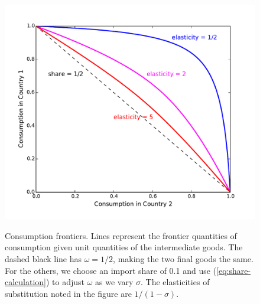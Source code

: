 \clearpage
\begin{figure}[htb]
\caption{Consumption frontiers.
Lines represent the frontier quantities of consumption given unit quantities of the intermediate goods.
The dashed black line has $\omega = 1/2$, making the two final goods the same.
For the others, we choose an import share of 0.1
and use (\ref{eq:share-calculation}) to adjust $\omega$ as we vary $\sigma$.
The elasticities of substitution noted in the figure are $1/(1-\sigma)$.}

\includegraphics[width=\textwidth]{images/BCFL/final-goods-frontier.pdf}
\label{fig:consumption-frontier}
\end{figure}


